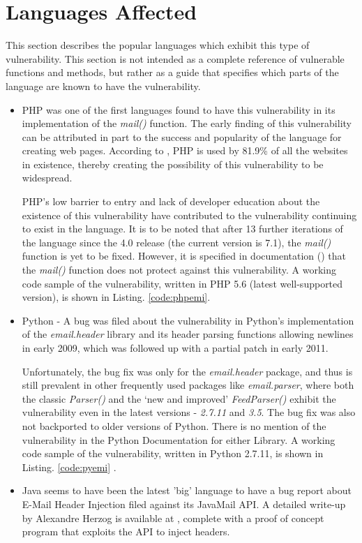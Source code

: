 \section{Languages Affected}

This section describes the popular languages which exhibit this type of vulnerability. This section is not intended as a complete reference of vulnerable functions and methods, but rather as a guide that specifies which parts of the language are known to have the vulnerability.
\begin{itemize}
	\item PHP was one of the first languages found to have this vulnerability in its implementation of the \emph{mail()} function. The early finding of this vulnerability can be attributed in part to the success and popularity of the language for creating web pages. According to \cite{W3techs}, PHP is used by 81.9\% of all the websites in existence, thereby creating the possibility of this vulnerability to be widespread. 
	
	PHP's low barrier to entry and lack of developer education about the existence of this vulnerability have contributed to the vulnerability continuing to exist in the language.
	It is to be noted that after 13 further iterations of the language since the 4.0 release (the current version is 7.1), the \emph{mail()} function is yet to be fixed. However, it is specified in documentation (\cite{PHPDocs}) that the \emph{mail()} function does not protect against this vulnerability.
	A working code sample of the vulnerability, written in PHP 5.6 (latest well-supported version), is shown in  Listing. \ref{code:phpemi}.
	
	
	
	
	\item Python - A bug was filed about the vulnerability in Python's implementation of the \emph{email.header} library and its header parsing functions allowing newlines in early 2009, which was followed up with a partial patch in early 2011. 
	
	Unfortunately, the bug fix was only for the \emph{email.header} package, and thus is still prevalent in other frequently used packages like \emph{email.parser}, where both the classic \emph{Parser()} and the `new and improved' \emph{FeedParser()} exhibit the vulnerability even in the latest versions - \emph{2.7.11} and \emph{3.5}. The bug fix was also not backported to older versions of Python. 
	There is no mention of the vulnerability in the Python Documentation for either Library.
	A working code sample of the vulnerability, written in Python 2.7.11, is shown in Listing. \ref{code:pyemi}
	.
	\item Java seems to have been the latest 'big' language to have a bug report about E-Mail Header Injection filed against its JavaMail API. A detailed write-up by Alexandre Herzog is available at \cite{Herzog.2014}, complete with a proof of concept program that exploits the API to inject headers.
	

\end{itemize}
